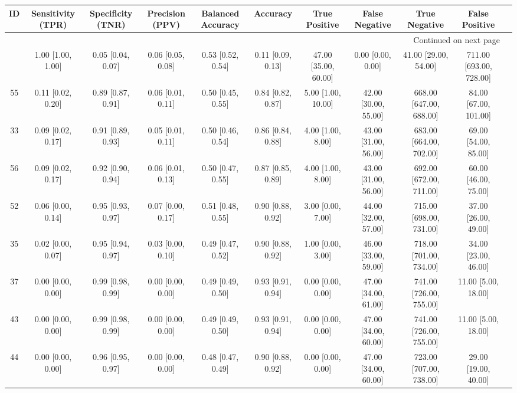\documentclass[8pt]{article}
\begin{document}
\begin{center}
\begin{footnotesize}
\begin{longtable}{|ccccccccccc|}
\toprule
 ID &  Sensitivity (TPR) &  Specificity (TNR) &    Precision (PPV) &  Balanced Accuracy &           Accuracy &         True Positive &        False Negative &            True Negative &           False Positive \\
\midrule
\endhead
\midrule
\multicolumn{10}{r}{{Continued on next page}} \\
\midrule
\endfoot

\bottomrule
\endlastfoot
 38 &  1.00 [1.00, 1.00] &  0.05 [0.04, 0.07] &  0.06 [0.05, 0.08] &  0.53 [0.52, 0.54] &  0.11 [0.09, 0.13] &  47.00 [35.00, 60.00] &     0.00 [0.00, 0.00] &     41.00 [29.00, 54.00] &  711.00 [693.00, 728.00] \\
 55 &  0.11 [0.02, 0.20] &  0.89 [0.87, 0.91] &  0.06 [0.01, 0.11] &  0.50 [0.45, 0.55] &  0.84 [0.82, 0.87] &    5.00 [1.00, 10.00] &  42.00 [30.00, 55.00] &  668.00 [647.00, 688.00] &    84.00 [67.00, 101.00] \\
 33 &  0.09 [0.02, 0.17] &  0.91 [0.89, 0.93] &  0.05 [0.01, 0.11] &  0.50 [0.46, 0.54] &  0.86 [0.84, 0.88] &     4.00 [1.00, 8.00] &  43.00 [31.00, 56.00] &  683.00 [664.00, 702.00] &     69.00 [54.00, 85.00] \\
 56 &  0.09 [0.02, 0.17] &  0.92 [0.90, 0.94] &  0.06 [0.01, 0.13] &  0.50 [0.47, 0.55] &  0.87 [0.85, 0.89] &     4.00 [1.00, 8.00] &  43.00 [31.00, 56.00] &  692.00 [672.00, 711.00] &     60.00 [46.00, 75.00] \\
 52 &  0.06 [0.00, 0.14] &  0.95 [0.93, 0.97] &  0.07 [0.00, 0.17] &  0.51 [0.48, 0.55] &  0.90 [0.88, 0.92] &     3.00 [0.00, 7.00] &  44.00 [32.00, 57.00] &  715.00 [698.00, 731.00] &     37.00 [26.00, 49.00] \\
 35 &  0.02 [0.00, 0.07] &  0.95 [0.94, 0.97] &  0.03 [0.00, 0.10] &  0.49 [0.47, 0.52] &  0.90 [0.88, 0.92] &     1.00 [0.00, 3.00] &  46.00 [33.00, 59.00] &  718.00 [701.00, 734.00] &     34.00 [23.00, 46.00] \\
 37 &  0.00 [0.00, 0.00] &  0.99 [0.98, 0.99] &  0.00 [0.00, 0.00] &  0.49 [0.49, 0.50] &  0.93 [0.91, 0.94] &     0.00 [0.00, 0.00] &  47.00 [34.00, 61.00] &  741.00 [726.00, 755.00] &      11.00 [5.00, 18.00] \\
 43 &  0.00 [0.00, 0.00] &  0.99 [0.98, 0.99] &  0.00 [0.00, 0.00] &  0.49 [0.49, 0.50] &  0.93 [0.91, 0.94] &     0.00 [0.00, 0.00] &  47.00 [34.00, 60.00] &  741.00 [726.00, 755.00] &      11.00 [5.00, 18.00] \\
 44 &  0.00 [0.00, 0.00] &  0.96 [0.95, 0.97] &  0.00 [0.00, 0.00] &  0.48 [0.47, 0.49] &  0.90 [0.88, 0.92] &     0.00 [0.00, 0.00] &  47.00 [34.00, 60.00] &  723.00 [707.00, 738.00] &     29.00 [19.00, 40.00] \\
\end{longtable}
\end{footnotesize}
\end{center}
\end{document}
